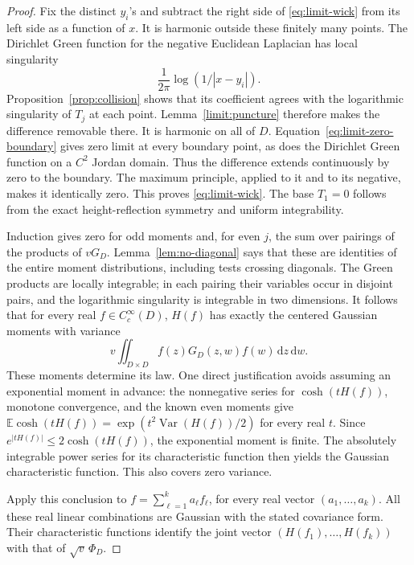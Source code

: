 \documentclass[11pt]{article}
\newcommand{\E}{\mathbb E}
\newcommand{\dd}{\,\mathrm d}
\DeclareMathOperator{\Var}{Var}
\theoremstyle{definition}
\theoremstyle{remark}
\numberwithin{equation}{section}
\begin{document}
\begin{proof}
Fix the distinct \(y_i\)'s and subtract the right side of
\eqref{eq:limit-wick} from its left side as a function of \(x\).
It is harmonic outside these finitely many points.
The Dirichlet Green function for the negative Euclidean Laplacian
has local singularity
\[
             \frac1{2\pi}\log(1/|x-y_i|).
\]
Proposition~\ref{prop:collision} shows that its coefficient agrees
with the logarithmic singularity of \(T_j\) at each point.
Lemma~\ref{limit:puncture} therefore makes the difference removable
there.  It is harmonic on all of \(D\).
Equation~\eqref{eq:limit-zero-boundary} gives zero limit at every
boundary point, as does the Dirichlet Green function on a \(C^2\)
Jordan domain.  Thus the difference extends continuously by zero
to the boundary.  The maximum principle, applied to it and to its
negative, makes it identically zero.  This proves
\eqref{eq:limit-wick}.  The base \(T_1=0\) follows from the exact
height-reflection symmetry and uniform integrability.

Induction gives zero for odd moments and, for even \(j\), the sum
over pairings of the products of \(vG_D\).
Lemma~\ref{lem:no-diagonal} says that these are identities of the
entire moment distributions, including tests crossing diagonals.
The Green products are locally integrable; in each pairing their
variables occur in disjoint pairs, and the logarithmic singularity
is integrable in two dimensions.
It follows that for every real \(f\in C_c^\infty(D)\), \(H(f)\)
has exactly the centered Gaussian moments with variance
\[
       v\iint_{D\times D}f(z)G_D(z,w)f(w)\dd z\dd w.
\]
These moments determine its law.  One direct justification avoids
assuming an exponential moment in advance: the nonnegative series
for \(\cosh(tH(f))\), monotone convergence, and the known even
moments give
\(\E\cosh(tH(f))=\exp(t^2\Var(H(f))/2)\) for every real \(t\).
Since \(e^{|tH(f)|}\le2\cosh(tH(f))\), the exponential moment is
finite.  The absolutely integrable power series for its
characteristic function then yields the Gaussian characteristic
function.  This also covers zero variance.

Apply this conclusion to
\(f=\sum_{\ell=1}^k a_\ell f_\ell\), for every real vector
\((a_1,\ldots,a_k)\).  All these real linear combinations are
Gaussian with the stated covariance form.  Their characteristic
functions identify the joint vector
\((H(f_1),\ldots,H(f_k))\) with that of
\(\sqrt v\,\Phi_D\).


\end{proof}
\end{document}
